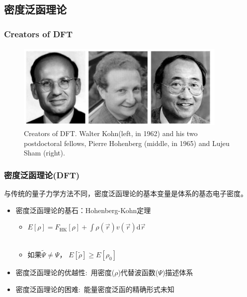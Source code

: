 \subsection{密度泛函理论}       %
\frame
{
	\frametitle{\rm{Creators of DFT}}
\begin{figure}[h!]
\vskip 10pt
\centering
\includegraphics[height=1.65in,width=4.0in,viewport=0 0 1562 610,clip]{Figures/Creators_of_DFT.png}
\caption{\tiny \textrm{Creators of DFT. Walter Kohn(left, in 1962) and his two postdoctoral fellows, Pierre Hohenberg (middle, in 1965) and Lujeu Sham (right).}}%
\label{Creator_of_DFT}
\end{figure}
}

\frame                               %
{
\frametitle{密度泛函理论(\textrm{DFT})} %
与传统的量子力学方法不同，密度泛函理论的基本变量是体系的基态电子密度。%
\begin{itemize}%
	\item 密度泛函理论的基石：\textrm{Hohenberg-Kohn}定理
\vskip 5pt
\begin{itemize}%
   \setlength{\itemsep}{8pt}
 \item $E[\rho]=F_{\mathrm{HK}}[\rho]+\displaystyle\int\rho(\vec{r})v(\vec{r})\textrm{d}\vec{r}$ \\
\vskip 5pt 
{\fontsize{7.2pt}{6.2pt}}\\%
\textcolor{magenta}{\fontsize{8.2pt}{6.2pt}\selectfont{第一定理表明多电子体系的性质完全由体系的基态密度决定}}
   \item 如果$\tilde\Psi\neq\Psi$，
     $E[\tilde\rho]\geqslant E[\rho_0]$\\
     \textcolor{magenta}{\fontsize{8.2pt}{6.2pt}\selectfont{第二定理指出基态总能量泛函在体系基态电子密度处取极小值}}
   \end{itemize}
\vskip 8pt
 \item 密度泛函理论的优越性:~用密度($\rho$)代替波函数($\Psi$)描述体系
\vskip 5pt
 \item 密度泛函理论的困难:~能量密度泛函的精确形式未知
   \end{itemize}
}

